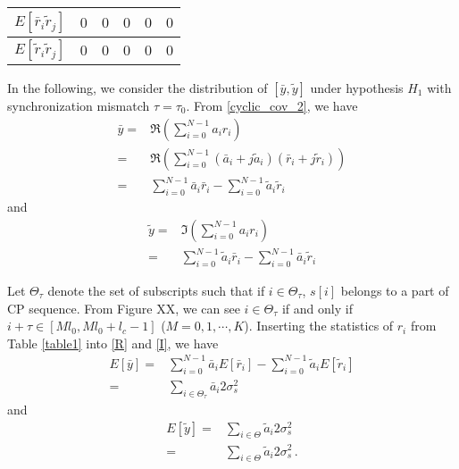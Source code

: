 \begin{table}[h]
\begin{tabular}{|c|c|c|c|c|c|}
	$E[\bar{r}_i\tilde{r}_j]$   & $0$                    & $0$                                                     & $0$                            & $0$                                                     & $0$                            \\ \hline
	$E[\tilde{r}_i\tilde{r}_j]$ & $0$                    & $0$                                                     & $0$                            & $0$                                                     & $0$                            \\ \hline
  \end{tabular}
\end{table}


In the following, we consider the distribution of $[\bar{y}, \tilde{y}]$ under hypothesis $H_1$ with synchronization mismatch $\tau = \tau_0$.
From \eqref{cyclic_cov_2}, we have
\begin{equation}
  \begin{split}
  \bar{y} = &\Re{(\sum_{i=0}^{N-1} a_ir_i)}\\
  = &\Re(\sum_{i=0}^{N-1}(\bar{a}_i+j\tilde{a}_i)(\bar{r}_i+j\tilde{r}_i))\\
  = &\sum_{i=0}^{N-1}\bar{a}_i\bar{r}_i - \sum_{i=0}^{N-1}\tilde{a}_i\tilde{r}_i
\end{split}
  \label{R}
\end{equation}
and
\begin{equation}
  \begin{split}
    \tilde{y} = &\Im(\sum_{i=0}^{N-1} a_ir_i)\\
      = &\sum_{i=0}^{N-1}\tilde{a}_i\bar{r}_i - \sum_{i=0}^{N-1}\bar{a}_i\tilde{r}_i
  \end{split}
  \label{I}
\end{equation}

Let $\Theta_\tau$ denote the set of subscripts such that if $i \in \Theta_\tau$,  $s[i]$ belongs to a part of CP sequence.
From Figure XX, we can see $i \in \Theta_\tau$ if and only if $i + \tau \in [Ml_0, Ml_0+l_c -1]$ ($M = 0, 1, \cdots, K$). Inserting the statistics of $r_i$ from Table \ref{table1} into \eqref{R} and \eqref{I}, we have
\begin{equation}
\begin{split}
  E[\bar{y}] = &\sum_{i=0}^{N-1}\bar{a}_iE[\bar{r}_i] - \sum_{i=0}^{N-1}\tilde{a}_iE[\tilde{r}_i]\\
  = &\sum_{i\in\Theta_\tau}\bar{a}_i2\sigma_s^2
  \end{split}
  \label{ER}
\end{equation}
and
\begin{equation}
\begin{split}
  E[\tilde{y}] = &\sum_{i\in\Theta}\tilde{a}_i2\sigma_s^2\\
  = &\sum_{i\in\Theta}\tilde{a}_i2\sigma_s^2\,.
  \end{split}
  \label{EI}
\end{equation}

